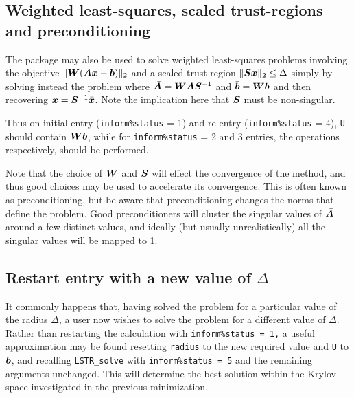 \documentclass{galahad}
\newcommand{\packagename}{LS\-TR}
\begin{document}

\subsection{Weighted least-squares, scaled trust-regions and preconditioning}
The package may also be used to solve weighted least-squares problems
involving the objective $\| {\bm{W}}({\bm{A}}{\bm{x}}-{\bm{b}})\|_2$ and a scaled trust region
$\|{\bm{S}}{\bm{x}}\|_2 \leq \Delta$ simply by solving instead the problem
where $\bar{{\bm{A}}} = {\bm{W}} {\bm{A}} {\bm{S}}^{-1}$ and
$\bar{{\bm{b}}} = {\bm{W}} {\bm{b}}$
and then recovering ${\bm{x}} = {\bm{S}}^{-1} \bar{{\bm{x}}}$. Note the implication here
that ${\bm{S}}$ must be non-singular.

Thus on initial entry ({\tt inform\%status} = 1) and re-entry
({\tt inform\%status} = 4), {\tt U} should contain ${\bm{W}} {\bm{b}}$,
while for {\tt inform\%status} = 2 and 3 entries, the operations
respectively, should be performed.

Note that the choice of ${\bm{W}}$ and ${\bm{S}}$ will effect the convergence of the
method, and thus good choices may be used to accelerate its convergence. This
is often known as preconditioning, but be aware that preconditioning changes
the norms that define the problem. Good preconditioners will cluster
the singular values of $\bar{{\bm{A}}}$ around a few distinct values, and ideally
(but usually unrealistically) all the singular values will be mapped to 1.


\subsection{Restart entry with a new value of $\Delta$}
It commonly happens that, having solved the problem for a particular value
of the radius $\Delta$, a user now wishes to solve the problem for a different
value of $\Delta$. Rather than restarting the calculation with
{\tt inform\%status = 1,} a useful approximation may be found
resetting {\tt radius} to the new required value and {\tt U} to ${\bm{b}}$,
and recalling {\tt \packagename\_solve}
with {\tt inform\%status = 5} and the remaining arguments unchanged.
This will determine the best solution within the Krylov space investigated
in the previous minimization.
\end{document}
